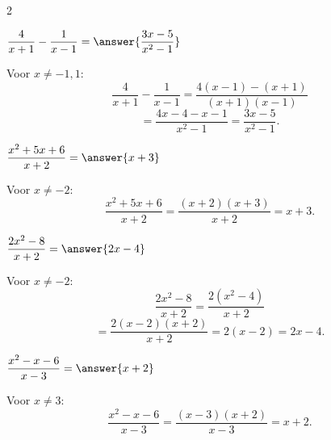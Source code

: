 \documentclass{ximera}
\begin{document}
\begin{oefening}{\oefB}
\begin{multicols}{2}
            
            \begin{question}
            $\dfrac4{x+1}-\dfrac1{x-1}
            =\answer{\dfrac{3x-5}{x^2-1}}$
            
            \begin{oplossing}
            Voor $x\neq-1,1$:
            \[
            \dfrac4{x+1}-\dfrac1{x-1}
            =\dfrac{4(x-1)-(x+1)}{(x+1)(x-1)}
            \]
            \[
            =\dfrac{4x-4-x-1}{x^2-1}
            =\dfrac{3x-5}{x^2-1}.
            \]
            \end{oplossing}
            \end{question}
            
            
            \begin{question}
            $\dfrac{x^2+5x+6}{x+2}
            =\answer{x+3}$
            
            \begin{oplossing}
            Voor $x\neq-2$:
            \[
            \dfrac{x^2+5x+6}{x+2}
            =\dfrac{(x+2)(x+3)}{x+2}
            =x+3.
            \]
            \end{oplossing}
            \end{question}
            
            
            \begin{question}
            $\dfrac{2x^2-8}{x+2}
            =\answer{2x-4}$
            
            \begin{oplossing}
            Voor $x\neq-2$:
            \[
            \dfrac{2x^2-8}{x+2}
            =\dfrac{2(x^2-4)}{x+2}
            \]
            \[
            =\dfrac{2(x-2)(x+2)}{x+2}
            =2(x-2)
            =2x-4.
            \]
            \end{oplossing}
            \end{question}
            
            
            \begin{question}
            $\dfrac{x^2-x-6}{x-3}
            =\answer{x+2}$
            
            \begin{oplossing}
            Voor $x\neq3$:
            \[
            \dfrac{x^2-x-6}{x-3}
            =\dfrac{(x-3)(x+2)}{x-3}
            =x+2.
            \]
            \end{oplossing}
            \end{question}
            

\end{multicols}
\end{oefening}
\end{document}
